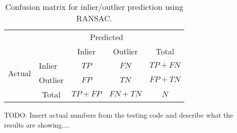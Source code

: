 \begin{table}[H]
	\centering
	\begin{tabular}{l|l|c|c|c}
		\multicolumn{2}{c}{}&\multicolumn{2}{c}{Predicted}&\\
		\cline{3-4}
		\multicolumn{2}{c|}{}&Inlier&Outlier&\multicolumn{1}{c}{Total}\\
		\cline{2-4}
		\multirow{2}{*}{Actual}& Inlier & $TP$ & $FN$ & $TP+FN$\\
		\cline{2-4}
		& Outlier & $FP$ & $TN$ & $FP+TN$\\
		\cline{2-4}
		\multicolumn{1}{c}{} & \multicolumn{1}{c}{Total} & \multicolumn{1}{c}{$TP+FP$} & \multicolumn{    1}{c}{$FN+TN$} & \multicolumn{1}{c}{$N$}\\
	\end{tabular}
	\caption{Confusion matrix for inlier/outlier prediction using RANSAC.}
	\label{table:consensusconfusion}
\end{table}

TODO: Insert actual numbers from the testing code and describe what the results are showing....